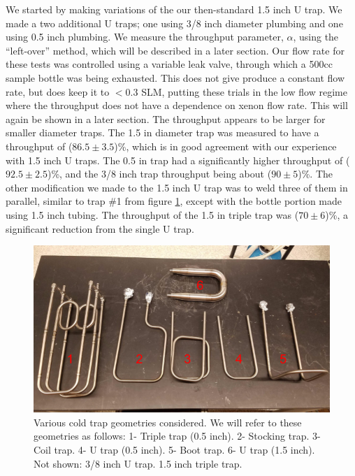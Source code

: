 \documentclass[12pt]{article}
\begin{document}
We started by making variations of the our then-standard 1.5 inch U trap. We made a two additional U traps; one using 3/8 inch diameter plumbing and one using 0.5 inch plumbing. We measure the throughput parameter, $\alpha$, using the ``left-over'' method, which will be described in a later section. Our flow rate for these tests was controlled using a variable leak valve, through which a 500cc sample bottle was being exhausted. This does not give produce a constant flow rate, but does keep it to $<0.3$ SLM, putting these trials in the low flow regime where the throughput does not have a dependence on xenon flow rate. This will again be shown in a later section. The throughput appears to be larger for smaller diameter traps. The 1.5 in diameter trap was measured to have a throughput of ($86.5\pm3.5$)\%, which is in good agreement with our experience with 1.5 inch U traps. The 0.5 in trap had a significantly higher throughput of ($92.5\pm 2.5$)\%, and the 3/8 inch trap throughput being about ($90\pm 5$)\%. The other modification we made to the 1.5 inch U trap was to weld three of them in parallel, similar to trap \#1 from figure \ref{fig:geometries}, except with the bottle portion made using 1.5 inch tubing. The throughput of the 1.5 in triple trap was ($70\pm6$)\%, a significant reduction from the single U trap.
\begin{figure}[h!]
\centering
\includegraphics[width=\textwidth]{Figures/cold_trap_geometries.png}
\caption{Various cold trap geometries considered. We will refer to these geometries as follows: 1- Triple trap (0.5 inch). 2- Stocking trap. 3- Coil trap. 4- U trap (0.5 inch). 5- Boot trap. 6- U trap (1.5 inch). Not shown: 3/8 inch U trap. 1.5 inch triple trap. }
\label{fig:geometries}
\end{figure}
\end{document}
